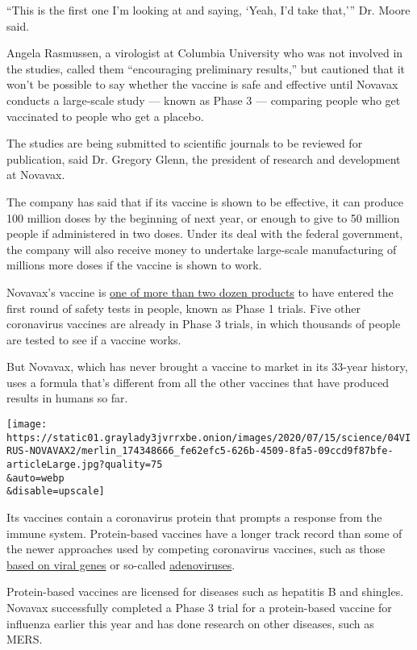 ``This is the first one I'm looking at and saying, `Yeah, I'd take
that,''' Dr. Moore said.

Angela Rasmussen, a virologist at Columbia University who was not
involved in the studies, called them ``encouraging preliminary
results,'' but cautioned that it won't be possible to say whether the
vaccine is safe and effective until Novavax conducts a large-scale study
--- known as Phase 3 --- comparing people who get vaccinated to people
who get a placebo.

The studies are being submitted to scientific journals to be reviewed
for publication, said Dr. Gregory Glenn, the president of research and
development at Novavax.

The company has said that if its vaccine is shown to be effective, it
can produce 100 million doses by the beginning of next year, or enough
to give to 50 million people if administered in two doses. Under its
deal with the federal government, the company will also receive money to
undertake large-scale manufacturing of millions more doses if the
vaccine is shown to work.

Novavax's vaccine is
\href{https://www.nytimes3xbfgragh.onion/interactive/2020/science/coronavirus-vaccine-tracker.html}{one
of more than two dozen products} to have entered the first round of
safety tests in people, known as Phase 1 trials. Five other coronavirus
vaccines are already in Phase 3 trials, in which thousands of people are
tested to see if a vaccine works.

But Novavax, which has never brought a vaccine to market in its 33-year
history, uses a formula that's different from all the other vaccines
that have produced results in humans so far.

\texttt{[image: https://static01.graylady3jvrrxbe.onion/images/2020/07/15/science/04VIRUS-NOVAVAX2/merlin\_174348666\_fe62efc5-626b-4509-8fa5-09ccd9f87bfe-articleLarge.jpg?quality=75\\\&auto=webp\\\&disable=upscale]}

Its vaccines contain a coronavirus protein that prompts a response from
the immune system. Protein-based vaccines have a longer track record
than some of the newer approaches used by competing coronavirus
vaccines, such as those
\href{https://www.nytimes3xbfgragh.onion/2020/07/28/health/coronavirus-moderna-vaccine-monkeys.html}{based
on viral genes} or so-called
\href{https://www.nytimes3xbfgragh.onion/2020/07/20/world/covid-coronavirus-vaccine.html}{adenoviruses}.

Protein-based vaccines are licensed for diseases such as hepatitis B and
shingles. Novavax successfully completed a Phase 3 trial for a
protein-based vaccine for influenza earlier this year and has done
research on other diseases, such as MERS.

